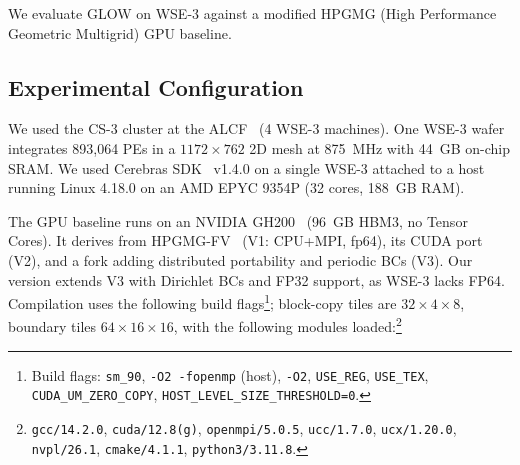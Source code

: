 \documentclass[conference]{IEEEtran}
\begin{document}
        We evaluate GLOW on WSE-3 against a modified HPGMG (High Performance Geometric Multigrid) GPU baseline.
        \subsection{Experimental Configuration}
            We used the CS-3 cluster at the ALCF~\cite{alcf_aitestbed} (4 WSE-3 machines). One WSE-3 wafer integrates 893,064 PEs in a $1172 \times 762$ 2D mesh at 875~MHz with 44~GB on-chip SRAM. We used Cerebras SDK~\cite{cerebras_sdk} v1.4.0 on a single WSE-3 attached to a host running Linux 4.18.0 on an AMD EPYC 9354P (32 cores, 188~GB RAM).

            \begin{sloppypar}
            The GPU baseline runs on an NVIDIA GH200~\cite{tacc_vista} (96~GB HBM3, no Tensor Cores). It derives from HPGMG-FV~\cite{hpgmg_org} (V1: CPU+MPI, fp64), its CUDA port~\cite{hpgmg_cuda} (V2), and a fork adding distributed portability and periodic BCs (V3). Our version extends V3 with Dirichlet BCs and FP32 support, as WSE-3 lacks FP64. Compilation uses the following build flags\footnote{Build flags: \texttt{sm\_90}, \texttt{-O2 -fopenmp} (host), \texttt{-O2}, \texttt{USE\_REG}, \texttt{USE\_TEX}, \texttt{CUDA\_UM\_ZERO\_COPY}, \texttt{HOST\_LEVEL\_SIZE\_THRESHOLD=0}.}; block-copy tiles are $32{\times}4{\times}8$, boundary tiles $64{\times}16{\times}16$, with the following modules loaded:\footnote{\texttt{gcc/14.2.0}, \texttt{cuda/12.8(g)}, \texttt{openmpi/5.0.5}, \texttt{ucc/1.7.0}, \texttt{ucx/1.20.0}, \texttt{nvpl/26.1}, \texttt{cmake/4.1.1}, \texttt{python3/3.11.8}.}
            \end{sloppypar}
       
\end{document}
